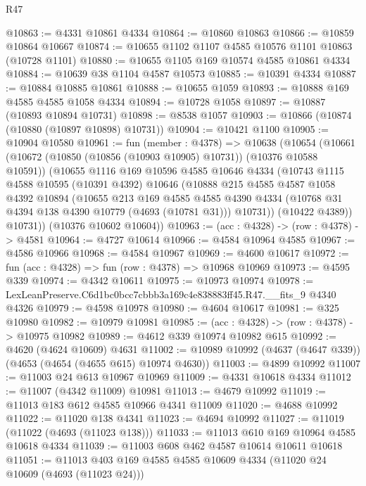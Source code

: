 \begin{lexlean}{R47}
\begin{coremodule}
@10863 := @4331 @10861 @4334
@10864 := @10860 @10863
@10866 := @10859 @10864 @10667
@10874 := @10655 @1102 @1107 @4585 @10576 @1101 @10863 (@10728 @1101)
@10880 := @10655 @1105 @169 @10574 @4585 @10861 @4334
@10884 := @10639 @38 @1104 @4587 @10573
@10885 := @10391 @4334
@10887 := @10884 @10885 @10861
@10888 := @10655 @1059
@10893 := @10888 @169 @4585 @4585 @1058 @4334
@10894 := @10728 @1058
@10897 := @10887 (@10893 @10894 @10731)
@10898 := @8538 @1057
@10903 := @10866 (@10874 (@10880 (@10897 @10898) @10731))
@10904 := @10421 @1100
@10905 := @10904 @10580
@10961 := fun (member : @4378) =>
  @10638
    (@10654
      (@10661
        (@10672 (@10850 (@10856 (@10903 @10905) @10731)) (@10376 @10588 @10591))
        (@10655
          @1116
          @169
          @10596
          @4585
          @10646
          @4334
          (@10743
            @1115
            @4588
            @10595
            (@10391 @4392)
            @10646
            (@10888
              @215
              @4585
              @4587
              @1058
              @4392
              @10894
              (@10655
                @213
                @169
                @4585
                @4585
                @4390
                @4334
                (@10768 @31 @4394 @138 @4390 @10779 (@4693 (@10781 @31)))
                @10731))
            (@10422 @4389))
          @10731))
      (@10376 @10602 @10604))
@10963 := (acc : @4328) -> (row : @4378) -> @4581
@10964 := @4727 @10614
@10966 := @4584 @10964 @4585
@10967 := @4586 @10966
@10968 := @4584 @10967
@10969 := @4600 @10617
@10972 := fun (acc : @4328) => fun (row : @4378) => @10968 @10969
@10973 := @4595 @339
@10974 := @4342 @10611
@10975 := @10973 @10974
@10978 := LexLeanPreserve.C6d1bc0bcc7cbbb3a169c4e838883ff45.R47.__fits_9 @4340 @4326
@10979 := @4598 @10978
@10980 := @4604 @10617
@10981 := @325 @10980
@10982 := @10979 @10981
@10985 := (acc : @4328) -> (row : @4378) -> @10975 @10982
@10989 := @4612 @339 @10974 @10982 @615
@10992 := @4620 (@4624 @10609) @4631
@11002 := @10989 @10992 (@4637 (@4647 @339)) (@4653 (@4654 (@4655 @615) @10974 @4630))
@11003 := @4899 @10992
@11007 := @11003 @24 @613 @10967 @10969
@11009 := @4331 @10618 @4334
@11012 := @11007 (@4342 @11009) @10981
@11013 := @4679 @10992
@11019 := @11013 @183 @612 @4585 @10966 @4341 @11009
@11020 := @4688 @10992
@11022 := @11020 @138 @4341
@11023 := @4694 @10992
@11027 := @11019 (@11022 (@4693 (@11023 @138)))
@11033 := @11013 @610 @169 @10964 @4585 @10618 @4334
@11039 := @11003 @608 @462 @4587 @10614 @10611 @10618
@11051 := @11013 @403 @169 @4585 @4585 @10609 @4334 (@11020 @24 @10609 (@4693 (@11023 @24)))

\end{coremodule}
\end{lexlean}
